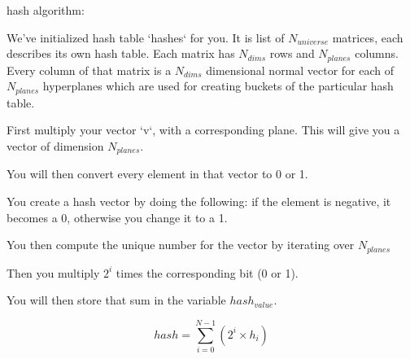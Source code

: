 \documentclass[4apaper,12pt]{book}
\begin{document}
\begin{description}
\item hash algorithm:

\item We've initialized hash table `hashes` for you. It is list of $N_{universe}$ matrices, each describes its own hash table. Each matrix has $N_{dims}$ rows and $N_{planes}$ columns. Every column of that matrix is a $N_{dims}$ dimensional normal vector for each of $N_{planes}$ hyperplanes which are used for creating buckets of the particular hash table.

\item  First multiply your vector `v`, with a corresponding plane. This will give you a vector of dimension $N_{planes}$.
\item You will then convert every element in that vector to 0 or 1.
\item You create a hash vector by doing the following: if the element is negative, it becomes a 0, otherwise you change it to a 1.
\item You then compute the unique number for the vector by iterating over $N_{planes}$
\item Then you multiply $2^i$ times the corresponding bit (0 or 1).
\item You will then store that sum in the variable $hash_{value}$.
\item $$ hash = \sum_{i=0}^{N-1} \left( 2^{i} \times h_{i} \right) $$

\end{description}
\end{document}
